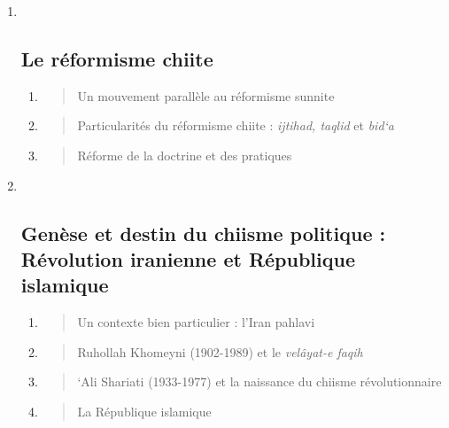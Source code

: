 \begin{enumerate}
\def\labelenumi{\Roman{enumi}.}
\item ~
  \hypertarget{le-ruxe9formisme-chiite}{%
  \subsection{\texorpdfstring{{Le réformisme
  chiite}}{Le réformisme chiite}}\label{le-ruxe9formisme-chiite}}

  \begin{enumerate}
  \def\labelenumii{\arabic{enumii}.}
  \item
    \begin{quote}
    Un mouvement parallèle au réformisme sunnite
    \end{quote}
  \item
    \begin{quote}
    Particularités du réformisme chiite : \emph{ijtihad, taqlid} et
    \emph{bid`a}
    \end{quote}
  \item
    \begin{quote}
    Réforme de la doctrine et des pratiques
    \end{quote}
  \end{enumerate}
\item ~
  \hypertarget{genuxe8se-et-destin-du-chiisme-politique-ruxe9volution-iranienne-et-ruxe9publique-islamique}{%
  \subsection{\texorpdfstring{{Genèse et destin du chiisme
  politique : Révolution iranienne et République
  islamique}}{Genèse et destin du chiisme politique : Révolution iranienne et République islamique}}\label{genuxe8se-et-destin-du-chiisme-politique-ruxe9volution-iranienne-et-ruxe9publique-islamique}}

  \begin{enumerate}
  \def\labelenumii{\arabic{enumii}.}
  \item
    \begin{quote}
    Un contexte bien particulier : l'Iran pahlavi
    \end{quote}
  \item
    \begin{quote}
    Ruhollah Khomeyni (1902-1989) et le \emph{velâyat-e faqih}
    \end{quote}
  \item
    \begin{quote}
    `Ali Shariati (1933-1977) et la naissance du chiisme révolutionnaire
    \end{quote}
  \item
    \begin{quote}
    La République islamique
    \end{quote}
  \end{enumerate}
\end{enumerate}


